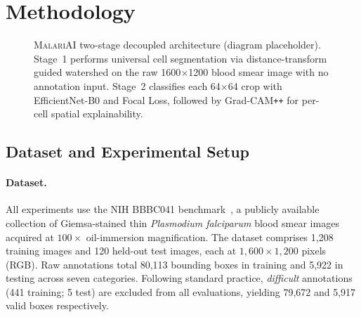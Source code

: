 \documentclass[10pt,twocolumn]{article}
\newcommand{\malariai}{\textsc{MalariAI}}
\begin{document}
\section{Methodology}
\label{sec:method}

\begin{figure}[t]
  \centering
  \caption{\malariai{} two-stage decoupled architecture (diagram
    placeholder). Stage~1 performs universal cell segmentation via
    distance-transform guided watershed on the raw 1600$\times$1200
    blood smear image with no annotation input. Stage~2 classifies
    each 64$\times$64 crop with EfficientNet-B0 and Focal Loss,
    followed by Grad-CAM\texttt{++} for per-cell spatial explainability.}
  \label{fig:architecture}
\end{figure}

\subsection{Dataset and Experimental Setup}
\label{ssec:dataset}

\paragraph{Dataset.}
All experiments use the NIH BBBC041 benchmark~\cite{bbbc041}, a publicly
available collection of Giemsa-stained thin \textit{Plasmodium falciparum}
blood smear images acquired at $100\times$ oil-immersion magnification.
The dataset comprises 1,208 training images and 120 held-out test images,
each at $1{,}600 \times 1{,}200$ pixels (RGB). Raw annotations total
80,113 bounding boxes in training and 5,922 in testing across seven
categories. Following standard practice, \textit{difficult} annotations
(441 training; 5 test) are excluded from all evaluations, yielding 79,672
and 5,917 valid boxes respectively.
\end{document}
